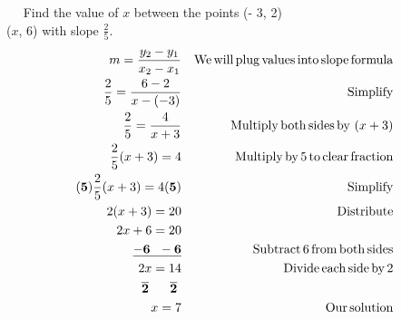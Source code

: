 \begin{example}\label{Lin54}~~
Find the value of $x$ between the points (- 3, 2)  \\($x$, 6) with
  slope $\displaystyle\frac{2}{5}$.\\
  \begin{eqnarray*}
    m = \frac{y_2 - y_1}{x_2 - x_1} &  & \operatorname{We} \operatorname{will} \operatorname{plug}
    \operatorname{values} \operatorname{into} \operatorname{slope} \operatorname{formula}\\
    \frac{2}{5} = \frac{6 - 2}{x - (- 3)} &  & \operatorname{Simplify}\\
    \frac{2}{5} = \frac{4}{x + 3} &  & \operatorname{Multiply} \operatorname{both}
    \operatorname{sides} \operatorname{by~} (x + 3) \\
    \frac{2}{5} (x + 3) = 4 &  & \operatorname{Multiply} \operatorname{by} 5 \operatorname{to}
    \operatorname{clear} \operatorname{fraction}\\
    {\bf(5)} \frac{2}{5} (x + 3) = 4 {\bf(5)} &  & \operatorname{Simplify}\\
    2 (x + 3) = 20 &  & \operatorname{Distribute}\\
    2 x + 6 = 20 &  &  \\
    \bf{\underline{- 6 ~~- 6}} &  & \operatorname{Subtract} 6 \operatorname{from} \operatorname{both}
    \operatorname{sides}\\
    2 x = 14 &  & \operatorname{Divide} \operatorname{each} \operatorname{side} \operatorname{by} 2\\
    \bf{\overline{2} ~~~~~ \overline{2}}~ &  & \\
    x = 7 &  & \operatorname{Our} \operatorname{solution}
  \end{eqnarray*}
\end{example}